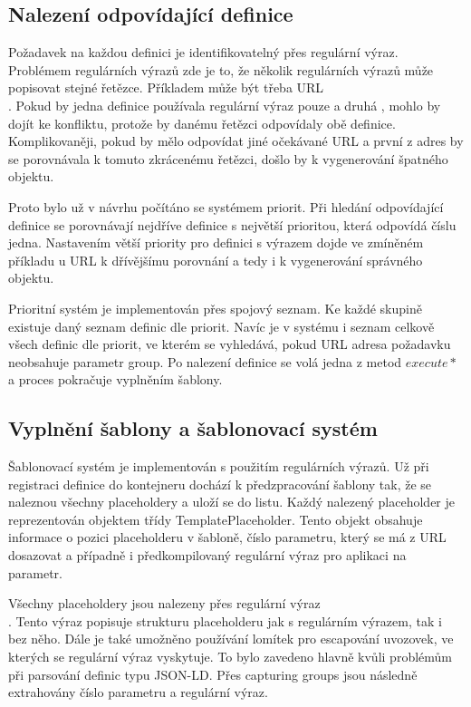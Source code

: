 \documentclass[thesis=B,czech]{FITthesis}[2012/06/26]
\begin{document}
  \subsection{Nalezení odpovídající definice}
  Požadavek na každou definici je identifikovatelný přes regulární výraz. Problémem regulárních výrazů zde je to, že několik regulárních výrazů může popisovat
  stejné řetězce. Příkladem může být třeba URL \\ . Pokud by jedna definice používala regulární výraz pouze  a druhá , mohlo
  by dojít ke konfliktu, protože by danému řetězci odpovídaly obě definice. Komplikovaněji, pokud by  mělo odpovídat jiné očekávané URL
   a první z adres by se porovnávala k tomuto zkrácenému řetězci, došlo by k vygenerování špatného objektu.
  
  Proto bylo už v návrhu počítáno se systémem priorit. Při hledání odpovídající definice se porovnávají nejdříve definice s největší prioritou, která odpovídá číslu jedna.
  Nastavením větší priority pro definici s výrazem  dojde ve zmíněném příkladu u URL  k dřívějšímu porovnání a tedy i 
  k vygenerování správného objektu.
  
  Prioritní systém je implementován přes spojový seznam. Ke každé skupině existuje daný seznam definic dle priorit. Navíc je v systému i seznam celkově všech
  definic dle priorit, ve kterém se vyhledává, pokud URL adresa požadavku neobsahuje parametr group. Po nalezení definice se volá jedna z metod $execute*$ a 
  proces pokračuje vyplněním šablony.
  
  \subsection{Vyplnění šablony a šablonovací systém}
  Šablonovací systém je implementován s použitím regulárních výrazů. Už při registraci definice do kontejneru dochází k předzpracování šablony tak, že se naleznou
  všechny placeholdery a uloží se do listu. Každý nalezený placeholder je reprezentován objektem třídy TemplatePlaceholder. Tento objekt obsahuje informace o pozici
  placeholderu v šabloně, číslo parametru, který se má z URL dosazovat a případně i předkompilovaný regulární výraz pro aplikaci na parametr. 
  
  Všechny placeholdery jsou nalezeny přes regulární výraz \\
  . Tento výraz popisuje strukturu placeholderu jak s regulárním výrazem, tak i bez něho. Dále je také umožněno používání lomítek pro escapování uvozovek,
  ve kterých se regulární výraz vyskytuje. To bylo zavedeno hlavně kvůli problémům při parsování definic typu JSON-LD. Přes capturing groups jsou následně extrahovány
  číslo parametru a regulární výraz.
  
\end{document}
